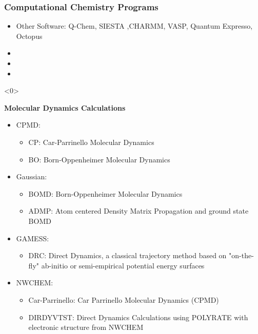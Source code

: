 \documentclass[slidestop,mathserif,compress,xcolor=svgnames]{beamer}
\newenvironment{eblock}[0]
{
\begin{beamerboxesrounded}[upper=uppercol2,lower=lowercol2,shadow=true]}
{\end{beamerboxesrounded}}
\begin{document}
\begin{frame}
  \frametitle{\small Computational Chemistry Programs}
  \begin{itemize}
  \item {\color{black}Other Software: Q-Chem, SIESTA ,CHARMM, VASP, Quantum Expresso, Octopus}
  \item {}
  \item {}
  \item {}
  \end{itemize}
\end{frame}

\begin{frame}<0>
  \vspace{0.5cm}
  \begin{eblock}{\bf Molecular Dynamics Calculations}
    \begin{itemize}
    \item CPMD:
      \begin{itemize}
      \item CP: Car-Parrinello Molecular Dynamics
      \item BO: Born-Oppenheimer Molecular Dynamics
      \end{itemize}
    \item Gaussian:
      \begin{itemize}
      \item BOMD: Born-Oppenheimer Molecular Dynamics
      \item ADMP: Atom centered Density Matrix Propagation and ground state BOMD
      \end{itemize}
    \item GAMESS:
      \begin{itemize}
      \item DRC: Direct Dynamics, a classical trajectory method based on "on-the-fly" ab-initio or semi-empirical potential energy surfaces
      \end{itemize}
    \item NWCHEM:
      \begin{itemize}
      \item Car-Parrinello: Car Parrinello Molecular Dynamics (CPMD)
      \item DIRDYVTST: Direct Dynamics Calculations using POLYRATE with electronic structure from NWCHEM
      \end{itemize}
    \end{itemize}
  \end{eblock}
\end{frame}
\end{document}
